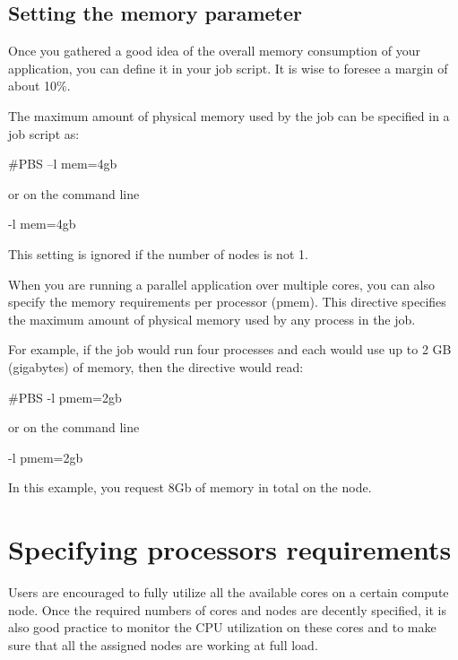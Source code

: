 \begin{prompt}
$ %
$ %
\end{prompt}

\subsection{Setting the memory parameter}

Once you gathered a good idea of the overall memory consumption of your application, you can define it in your job script.  It is wise to foresee a margin of about 10\%.


The maximum amount of physical memory used by the job can be specified in a job script as:
\begin{prog}
\#PBS --l mem=4gb
\end{prog}

or on the command line
\begin{prog}
-l mem=4gb
\end{prog}

This setting is ignored if the number of nodes is not 1.


When you are running a parallel application over multiple cores, you can also specify the memory requirements per processor (pmem). This directive specifies the maximum amount of physical memory used by any process in the job.

For example, if the job would run four processes and each would use up to 2 GB (gigabytes) of memory, then the directive would read:

\begin{prog}
 \#PBS -l pmem=2gb
\end{prog}

or on the command line
\begin{prog}
-l pmem=2gb
\end{prog}

In this example, you request 8Gb of memory in total on the node.

\section{Specifying processors requirements}

Users are encouraged to fully utilize all the available cores on a certain compute node. Once the required numbers of cores and nodes are decently specified, it is also good practice to monitor the CPU utilization on these cores and to make sure that all the assigned nodes are working at full load.


